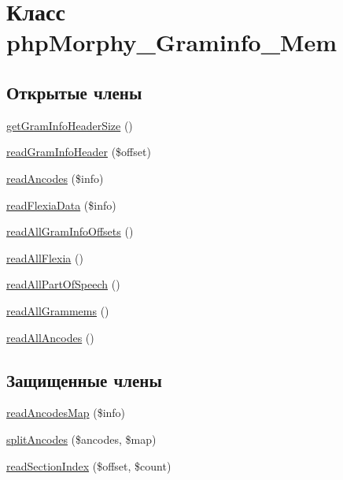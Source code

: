 \hypertarget{classphpMorphy__Graminfo__Mem}{
\section{Класс phpMorphy\_\-Graminfo\_\-Mem}
\label{classphpMorphy__Graminfo__Mem}
}
\subsection*{Открытые члены}
\begin{DoxyCompactItemize}
\item 
\hyperlink{classphpMorphy__Graminfo__Mem_a35261e7abc0af787f3a00b0d53e9e97e}{getGramInfoHeaderSize} ()
\item 
\hyperlink{classphpMorphy__Graminfo__Mem_ab6c8e8e88c64aa6724f61ff12a2892f0}{readGramInfoHeader} (\$offset)
\item 
\hyperlink{classphpMorphy__Graminfo__Mem_a2ce4f3765efccc05c4df6143388c81fc}{readAncodes} (\$info)
\item 
\hyperlink{classphpMorphy__Graminfo__Mem_af5caaa636c394d518b6c3a63ada2e320}{readFlexiaData} (\$info)
\item 
\hyperlink{classphpMorphy__Graminfo__Mem_ab97487dbfc48b7656a6744fcd41afdcb}{readAllGramInfoOffsets} ()
\item 
\hyperlink{classphpMorphy__Graminfo__Mem_a301a4a4828c362c6419f98d092c9dd8a}{readAllFlexia} ()
\item 
\hyperlink{classphpMorphy__Graminfo__Mem_a5331a2dd1c2b12b84a1b64c126ef747c}{readAllPartOfSpeech} ()
\item 
\hyperlink{classphpMorphy__Graminfo__Mem_a3afd91068850e1bb8d0b053c29b7d6ba}{readAllGrammems} ()
\item 
\hyperlink{classphpMorphy__Graminfo__Mem_a3df5956c2cfc22d8549ddd039522f249}{readAllAncodes} ()
\end{DoxyCompactItemize}
\subsection*{Защищенные члены}
\begin{DoxyCompactItemize}
\item 
\hyperlink{classphpMorphy__Graminfo__Mem_a6b4db69cff4bbd599dc90358fefb207b}{readAncodesMap} (\$info)
\item 
\hyperlink{classphpMorphy__Graminfo__Mem_a1413059c516acf240303fe7dc28a4085}{splitAncodes} (\$ancodes, \$map)
\item 
\hyperlink{classphpMorphy__Graminfo__Mem_a070adb082d4820e65e50452e6bb095ab}{readSectionIndex} (\$offset, \$count)
\end{DoxyCompactItemize}


